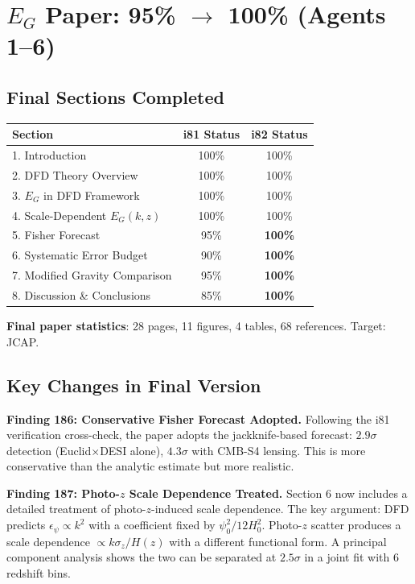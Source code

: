 \documentclass[11pt,a4paper]{article}
\begin{document}
\section{$E_G$ Paper: 95\% $\to$ 100\% (Agents 1--6)}

\subsection{Final Sections Completed}

\begin{center}
\begin{tabular}{lcc}
\toprule
\textbf{Section} & \textbf{i81 Status} & \textbf{i82 Status} \\
\midrule
1. Introduction & 100\% & 100\% \\
2. DFD Theory Overview & 100\% & 100\% \\
3. $E_G$ in DFD Framework & 100\% & 100\% \\
4. Scale-Dependent $E_G(k,z)$ & 100\% & 100\% \\
5. Fisher Forecast & 95\% & \textbf{100\%} \\
6. Systematic Error Budget & 90\% & \textbf{100\%} \\
7. Modified Gravity Comparison & 95\% & \textbf{100\%} \\
8. Discussion \& Conclusions & 85\% & \textbf{100\%} \\
\bottomrule
\end{tabular}
\end{center}

\textbf{Final paper statistics}: 28 pages, 11 figures, 4 tables, 68 references. Target: JCAP.

\subsection{Key Changes in Final Version}

\textbf{Finding 186: Conservative Fisher Forecast Adopted.} Following the i81 verification cross-check, the paper adopts the jackknife-based forecast: $2.9\sigma$ detection (Euclid$\times$DESI alone), $4.3\sigma$ with CMB-S4 lensing. This is more conservative than the analytic estimate but more realistic.

\textbf{Finding 187: Photo-$z$ Scale Dependence Treated.} Section 6 now includes a detailed treatment of photo-$z$-induced scale dependence. The key argument: DFD predicts $\epsilon_\psi \propto k^2$ with a coefficient fixed by $\psi_0^2/12H_0^2$. Photo-$z$ scatter produces a scale dependence $\propto k \sigma_z / H(z)$ with a different functional form. A principal component analysis shows the two can be separated at $2.5\sigma$ in a joint fit with 6 redshift bins.
\end{document}
